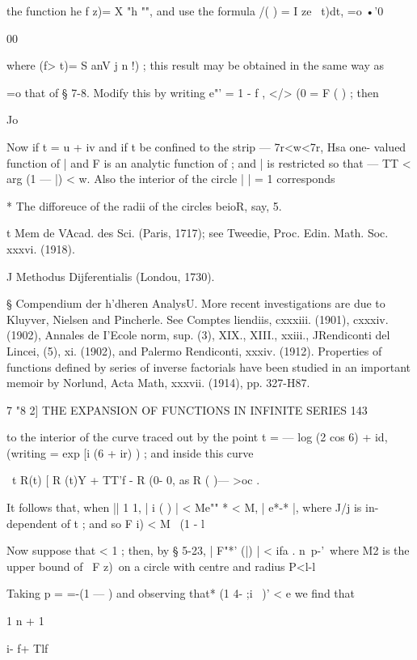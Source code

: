 {the function he f z)= X "h "", and use the formula /( ) = I ze~   t)dt, 
 =o •'0 

00 

where (f> t)= S anV j n !) ; this result may be obtained in the same way as 

 =o 
that of § 7-8. Modify this by writing e"' = 1 - f , </> (0 = F ( ) ; then 

Jo 

Now if t = u + iv and if t be confined to the strip — 7r<w<7r, Hsa one- 
valued function of | and F    is an analytic function of  ; and | is restricted 
so that — TT < arg (1 — |) < w. Also the interior of the circle |   | = 1 corresponds 

* The difforeuce of the radii of the circles beioR, say, 5. 

t Mem de VAcad. des Sci. (Paris, 1717); see Tweedie, Proc. Edin. Math. Soc. xxxvi. (1918). 

J Methodus Dijferentialis (Londou, 1730). 

§ Compendium der h'dheren AnalysU. More recent investigations are due to Kluyver, Nielsen 
and Pincherle. See Comptes liendiis, cxxxiii. (1901), cxxxiv. (1902), Annales de I'Ecole norm, 
sup. (3), XIX., XIII., xxiii., JRendiconti del Lincei, (5), xi. (1902), and Palermo Rendiconti, xxxiv. 
(1912). Properties of functions defined by series of inverse factorials have been studied in an 
important memoir by Norlund, Acta Math, xxxvii. (1914), pp. 327-H87. 



7 "8 2] THE EXPANSION OF FUNCTIONS IN INFINITE SERIES 143 



to the interior of the curve traced out by the point t = — log (2 cos  6) +   id, 
(writing   = exp [i (6 + ir) ) ; and inside this curve 

\ t R(t) [ R (t)Y + TT'f - R (0- 0, 
as R ( )— >oc . 

It follows that, when || 1   1, | i ( ) | < Me"" *  < M, | e*-* |, where J/j is in- 
dependent of t ; and so F i) < M  \ (1 -  l 

Now suppose that   < 1 ; then, by § 5-23, | F"*' (|) | < ifa . n\ p-'\ where 
M2 is the upper bound of \ F z)\ on a circle with centre   and radius 
P<l-l 

Taking p = =-(1 —  ) and observing that* (1 4- ;i~ )'  < e we find that 

1 n + 1 



i- f+ Tlf 



}
